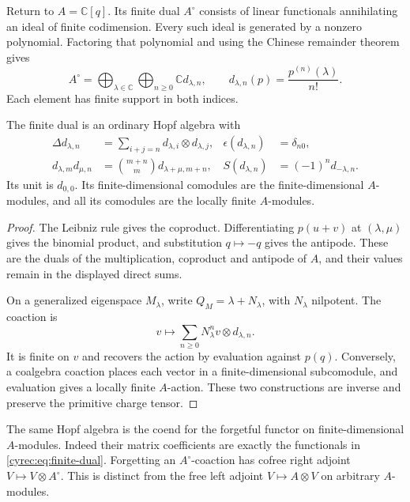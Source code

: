 Return to $A=\mathbb C[q]$. Its finite dual $A^\circ$ consists
of linear functionals annihilating an ideal of finite codimension.
Every such ideal is generated by a nonzero polynomial. Factoring
that polynomial and using the Chinese remainder theorem gives
\begin{equation}\label{cyrec:eq:finite-dual}
 A^\circ=\bigoplus_{\lambda\in\mathbb C}
               \bigoplus_{n\geq0}\mathbb C d_{\lambda,n},
 \qquad d_{\lambda,n}(p)=\frac{p^{(n)}(\lambda)}{n!}.
\end{equation}
Each element has finite support in both indices.

\begin{proposition}\label{cyrec:prop:finite-dual}
The finite dual is an ordinary Hopf algebra with
\begin{align}
 \Delta d_{\lambda,n}
  &=\sum_{i+j=n}d_{\lambda,i}\otimes d_{\lambda,j},
 &\epsilon(d_{\lambda,n})&=\delta_{n0},\label{cyrec:eq:distribution-delta}\\
 d_{\lambda,m}d_{\mu,n}
  &=\binom{m+n}{m}d_{\lambda+\mu,m+n},
 &S(d_{\lambda,n})&=(-1)^n d_{-\lambda,n}.
 \label{cyrec:eq:distribution-product}
\end{align}
Its unit is $d_{0,0}$. Its finite-dimensional comodules are the
finite-dimensional $A$-modules, and all its comodules are the
locally finite $A$-modules.
\end{proposition}

\begin{proof}
The Leibniz rule gives the coproduct. Differentiating
$p(u+v)$ at $(\lambda,\mu)$ gives the binomial product, and
substitution $q\mapsto-q$ gives the antipode.
These are the duals of the multiplication, coproduct and antipode
of $A$, and their values remain in the displayed direct sums.

On a generalized eigenspace $M_\lambda$, write
$Q_M=\lambda+N_\lambda$, with $N_\lambda$ nilpotent. The coaction
is
\begin{equation}\label{cyrec:eq:jordan-coaction}
 v\longmapsto\sum_{n\geq0}N_\lambda^n v\otimes d_{\lambda,n}.
\end{equation}
It is finite on $v$ and recovers the action by evaluation against
$p(q)$. Conversely, a coalgebra coaction places each vector in a
finite-dimensional subcomodule, and evaluation gives a locally
finite $A$-action. These two constructions are inverse and preserve
the primitive charge tensor.
\end{proof}

The same Hopf algebra is the coend for the forgetful functor on
finite-dimensional $A$-modules. Indeed their matrix coefficients
are exactly the functionals in \eqref{cyrec:eq:finite-dual}.
Forgetting an $A^\circ$-coaction has cofree right adjoint
$V\mapsto V\otimes A^\circ$. This is distinct from the free
left adjoint $V\mapsto A\otimes V$ on arbitrary $A$-modules.

